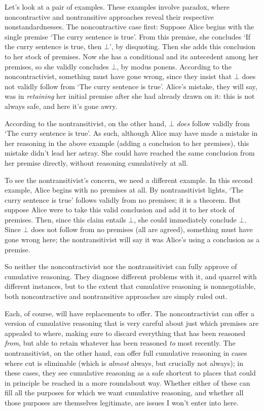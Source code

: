 \documentclass{ergoclass}
\begin{document}
Let's look at a pair of examples. These examples involve paradox, where noncontractive and nontransitive approaches reveal their respective nonstandardnesses. The noncontractive case first: Suppose Alice begins with the single premise `The curry sentence is true'. From this premise, she concludes `If the curry sentence is true, then $\bot$', by disquoting. Then she adds this conclusion to her stock of premises. Now she has a conditional and its antecedent among her premises, so she validly concludes $\bot$, by modus ponens. According to the noncontractivist, something must have gone wrong, since they insist that $\bot$ does not validly follow from `The curry sentence is true'. Alice's mistake, they will say, was in {\em retaining} her initial premise after she had already drawn on it: this is not always safe, and here it's gone awry.



According to the nontransitivist, on the other hand, $\bot$ {\em does} follow validly from `The curry sentence is true'. As such, although Alice may have made a mistake in her reasoning in the above example (adding a conclusion to her premises), this mistake didn't lead her astray. She could have reached the same conclusion from her premise directly, without reasoning cumulatively at all. 

To see the nontransitivist's concern, we need a different example. In this second example, Alice begins with no premises at all. By nontransitivist lights, `The curry sentence is true' follows validly from no premises; it is a theorem. But suppose Alice were to take this valid conclusion and add it to her stock of premises. Then, since this claim entails $\bot$, she could immediately conclude $\bot$. Since $\bot$ does not follow from no premises (all are agreed), something must have gone wrong here; the nontransitivist will say it was Alice's using a conclusion as a premise. 

So neither the noncontractivist nor the nontransitivist can fully approve of cumulative reasoning. They diagnose different problems with it, and quarrel with different instances, but to the extent that cumulative reasoning is nonnegotiable, both noncontractive and nontransitive approaches are simply ruled out.

Each, of course, will have replacements to offer. The noncontractivist can offer a version of cumulative reasoning that is very careful about just which premises are appealed to where, making sure to discard everything that has been reasoned {\em from}, but able to retain whatever has been reasoned {\em to} most recently. The nontransitivist, on the other hand, can offer full cumulative reasoning in cases where cut is eliminable (which is {\em almost} always, but crucially not always); in these cases, they see cumulative reasoning as a safe shortcut to places that could in principle be reached in a more roundabout way. Whether either of these can fill all the purposes for which we want cumulative reasoning, and whether all those purposes are themselves legitimate, are issues I won't enter into here.
\end{document}
